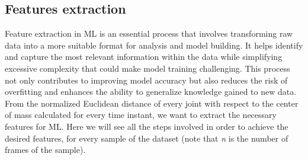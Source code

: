 \subsection{Features extraction}
Feature extraction in ML is an essential process that involves transforming raw data into a more suitable format for analysis and model building.
It helps identify and capture the most relevant information within the data while simplifying excessive complexity that could make model training challenging.
This process not only contributes to improving model accuracy but also reduces the risk of overfitting and enhances the ability to generalize knowledge gained to new data. \\
From the normalized Euclidean distance of every joint with respect to the center of mass calculated for every time instant, we want to extract the necessary features for ML.
Here we will see all the steps involved in order to achieve the desired features, for every sample of the dataset (note that \textit{n} is the number of frames of the sample). \\
